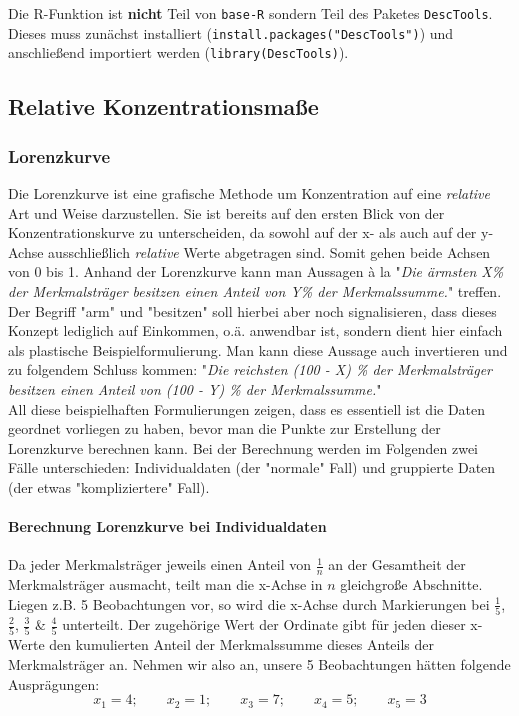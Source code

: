 \documentclass[a4paper]{article}
\newcommand\dangersign[1][2ex]{%
  \renewcommand\stacktype{L}%
  \scaleto{\stackon[1.3pt]{\color{red}$\triangle$}{\tiny !}}{#1}%
}
\begin{document}
\noindent {}

\noindent \dangersign[3ex] Die R-Funktion ist \textbf{nicht} Teil von \texttt{base-R} sondern Teil des Paketes \texttt{DescTools}. Dieses muss zunächst installiert (\texttt{install.packages("DescTools")}) und anschließend importiert werden (\texttt{library(DescTools)}).

\clearpage

\subsection{Relative Konzentrationsmaße}\label{sec:rel-konz}

\subsubsection{Lorenzkurve}\label{sec:lk}
Die Lorenzkurve ist eine grafische Methode um Konzentration auf eine \textit{relative} Art und Weise darzustellen. Sie ist bereits auf den ersten Blick von der Konzentrationskurve zu unterscheiden, da sowohl auf der x- als auch auf der y-Achse ausschließlich \textit{relative} Werte abgetragen sind. Somit gehen beide Achsen von 0 bis 1. Anhand der Lorenzkurve kann man Aussagen à la "\textit{Die ärmsten X\% der Merkmalsträger besitzen einen Anteil von Y\% der Merkmalssumme.}" treffen. Der Begriff "arm" und "besitzen" soll hierbei aber noch signalisieren, dass dieses Konzept lediglich auf Einkommen, o.ä. anwendbar ist, sondern dient hier einfach als plastische Beispielformulierung. Man kann diese Aussage auch invertieren und zu folgendem Schluss kommen: "\textit{Die reichsten (100 - X) \% der Merkmalsträger besitzen einen Anteil von (100 - Y) \% der Merkmalssumme.}"\\
All diese beispielhaften Formulierungen zeigen, dass es essentiell ist die Daten geordnet vorliegen zu haben, bevor man die Punkte zur Erstellung der Lorenzkurve berechnen kann. Bei der Berechnung werden im Folgenden zwei Fälle unterschieden: Individualdaten (der "normale" Fall) und gruppierte Daten (der etwas "kompliziertere" Fall).

\paragraph{Berechnung Lorenzkurve bei Individualdaten}
Da jeder Merkmalsträger jeweils einen Anteil von $\frac{1}{n}$ an der Gesamtheit der Merkmalsträger ausmacht, teilt man die x-Achse in $n$ gleichgroße Abschnitte. Liegen z.B. 5 Beobachtungen vor, so wird die x-Achse durch Markierungen bei $\frac{1}{5}$, $\frac{2}{5}$, $\frac{3}{5}$ \& $\frac{4}{5}$ unterteilt. Der zugehörige Wert der Ordinate gibt für jeden dieser x-Werte den kumulierten Anteil der Merkmalssumme dieses Anteils der Merkmalsträger an. Nehmen wir also an, unsere 5 Beobachtungen hätten folgende Ausprägungen:
$$x_1 = 4;\qquad x_2 = 1;\qquad x_3 = 7;\qquad x_4 = 5;\qquad x_5 = 3$$
\end{document}

